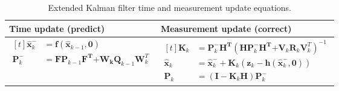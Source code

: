 \documentclass[12pt]{article}
\begin{document}
\begin{table}[h]
	\renewcommand{\arraystretch}{1.5}
	\caption{Extended Kalman filter time and measurement update equations.}
	\centering
	\label{tab:table-EKF}
	\begin{tabular}{C{7cm}|C{7cm}}
		\hline
		Time update (predict) & Measurement update (correct) \\
		\hline
		$\begin{aligned}[t]
			\mathbf{\hat{x}}_{k}^{-} &= \mathbf{f}( \mathbf{\hat{x}}_{k - 1}, \mathbf{0}) \\
			\mathbf{P}_{k}^{-} &= \mathbf{F}\mathbf{P}_{k - 1}\mathbf{F}^{\mathbf{T}}\mathbf{+}\mathbf{W}_{\mathbf{k}}\mathbf{Q}_{k-1}\mathbf{W}_{k}^{T}
		\end{aligned}$ &
		$\begin{aligned}[t]
			\mathbf{K}_{k} &= \mathbf{P}_{k}^{-}\mathbf{H}^{\mathbf{T}}( \mathbf{H}\mathbf{P}_{k}^{-}\mathbf{H}^{\mathbf{T}}\mathbf{+}\mathbf{V}_{k}\mathbf{R}_{k}\mathbf{V}_{k}^{T})^{- 1} \\
			\mathbf{\hat{x}}_{k} &= \mathbf{\hat{x}}_{k}^{-} + \mathbf{K}_{k}( \mathbf{z}_{k} - \mathbf{h}(\mathbf{\hat{x}}_{k}^{-},\mathbf{0})) \\
			\mathbf{P}_{k} &= ( \mathbf{I} - \mathbf{K}_{k}\mathbf{H})\mathbf{P}_{k}^{-}
		\end{aligned}$ \\
		\hline
	\end{tabular}
\end{table}
\end{document}
